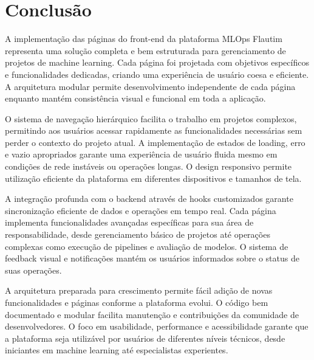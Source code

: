 \documentclass[12pt,a4paper]{article}
\begin{document}
\section{Conclusão}

A implementação das páginas do front-end da plataforma MLOps Flautim representa uma solução completa e bem estruturada para gerenciamento de projetos de machine learning. Cada página foi projetada com objetivos específicos e funcionalidades dedicadas, criando uma experiência de usuário coesa e eficiente. A arquitetura modular permite desenvolvimento independente de cada página enquanto mantém consistência visual e funcional em toda a aplicação.

O sistema de navegação hierárquico facilita o trabalho em projetos complexos, permitindo aos usuários acessar rapidamente as funcionalidades necessárias sem perder o contexto do projeto atual. A implementação de estados de loading, erro e vazio apropriados garante uma experiência de usuário fluida mesmo em condições de rede instáveis ou operações longas. O design responsivo permite utilização eficiente da plataforma em diferentes dispositivos e tamanhos de tela.

A integração profunda com o backend através de hooks customizados garante sincronização eficiente de dados e operações em tempo real. Cada página implementa funcionalidades avançadas específicas para sua área de responsabilidade, desde gerenciamento básico de projetos até operações complexas como execução de pipelines e avaliação de modelos. O sistema de feedback visual e notificações mantém os usuários informados sobre o status de suas operações.

A arquitetura preparada para crescimento permite fácil adição de novas funcionalidades e páginas conforme a plataforma evolui. O código bem documentado e modular facilita manutenção e contribuições da comunidade de desenvolvedores. O foco em usabilidade, performance e acessibilidade garante que a plataforma seja utilizável por usuários de diferentes níveis técnicos, desde iniciantes em machine learning até especialistas experientes.
\end{document}

